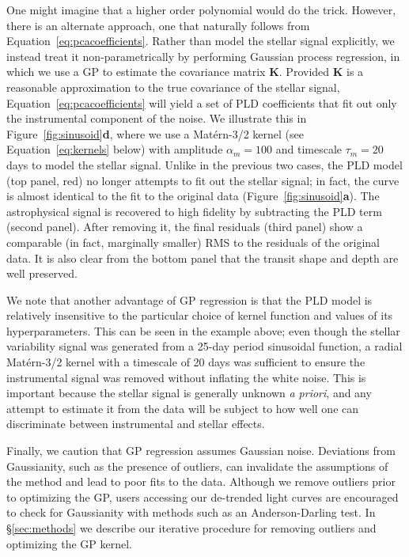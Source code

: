\documentclass[]{emulateapj}
\begin{document}
One might imagine that a higher order polynomial would do the trick. However, there
is an alternate approach, one that naturally follows from Equation~\ref{eq:pcacoefficients}.
Rather than model the stellar signal explicitly, we instead treat it non-parametrically
by performing Gaussian process regression, in
which we use a GP to estimate the covariance matrix $\mathbf{K}$. Provided
$\mathbf{K}$ is a reasonable approximation to the true covariance of the stellar signal,
Equation~\ref{eq:pcacoefficients} will yield a set of PLD coefficients that 
fit out only the instrumental component of the noise. We illustrate this in 
Figure~\ref{fig:sinusoid}\textbf{d}, where we use a Mat\'ern-3/2 kernel 
(see Equation~\ref{eq:kernels} below) with amplitude $\alpha_m = 100$ and timescale
$\tau_m = 20$ days to model the stellar signal. Unlike in the previous two cases,
the PLD model (top panel, red) no longer attempts to fit out the stellar signal; in 
fact, the curve is almost identical to the fit to the original data 
(Figure~\ref{fig:sinusoid}\textbf{a}). The astrophysical signal is
recovered to high fidelity by subtracting the PLD term (second panel). After removing it,
the final residuals (third panel) show a comparable (in fact, marginally smaller) RMS to the
residuals of the original data. It is also clear from the bottom panel that the transit 
shape and depth are well preserved.

We note that another advantage of GP regression is that the PLD model is
relatively insensitive to the particular choice of kernel function and values of its
hyperparameters. This can be seen in the example above; even though the stellar
variability signal was generated from a 25-day period sinusoidal function, a radial
Mat\'ern-3/2 kernel with a timescale of 20 days was sufficient to ensure the instrumental
signal was removed without inflating the white noise. This is important because the
stellar signal is generally unknown \emph{a priori}, and any attempt to estimate it from the data
will be subject to how well one can discriminate between instrumental and stellar effects.

Finally, we caution that GP regression assumes Gaussian noise. Deviations from Gaussianity,
such as the presence of outliers, can invalidate the assumptions of the method and lead
to poor fits to the data. Although we remove outliers prior to optimizing the GP, users
accessing our de-trended light curves are encouraged to check for Gaussianity with
methods such as an Anderson-Darling test. In \S\ref{sec:methods} we describe our 
iterative procedure for removing outliers and optimizing the GP kernel.
\end{document}
